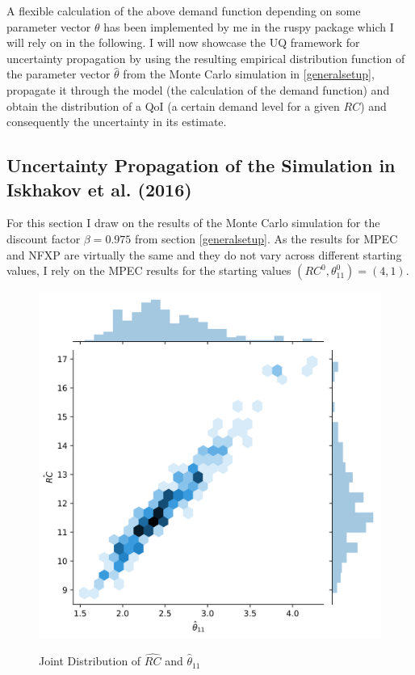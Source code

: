 A flexible calculation of the above demand function depending on some parameter vector $\theta$ has been implemented by me in the ruspy package which I will rely on in the following. I will now showcase the UQ framework for uncertainty propagation by using the resulting empirical distribution function of the parameter vector $\hat\theta$ from the Monte Carlo simulation in \ref{generalsetup}, propagate it through the model (the calculation of the demand function) and obtain the distribution of a QoI (a certain demand level for a given $RC$) and consequently the uncertainty in its estimate.

\subsection{Uncertainty Propagation of the Simulation in Iskhakov et al. (2016)}

For this section I draw on the results of the Monte Carlo simulation for the discount factor $\beta=0.975$ from section \ref{generalsetup}. As the results for MPEC and NFXP are virtually the same and they do not vary across different starting values, I rely on the MPEC results for the starting values $(RC^0, \theta^0_{11}) = (4,1)$.

\begin{figure}[!t]
	\caption{Joint Distribution of $\hat{RC}$ and $\hat\theta_{11}$}
	\centering
	\includegraphics[scale=0.8]{../figures/figure_2.png}
	\label{figure2}
\end{figure}

